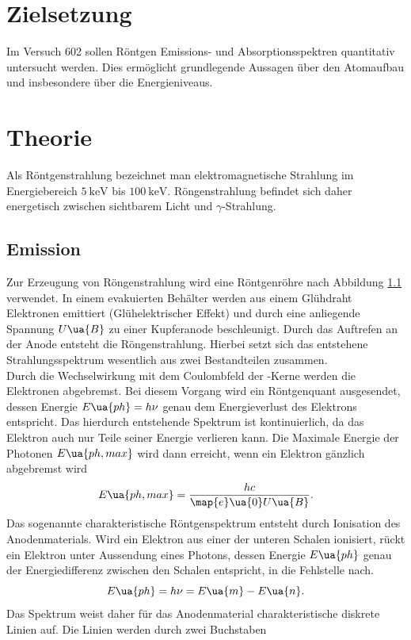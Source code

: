 \setcounter{page}{1}
\section*{Zielsetzung}
Im Versuch 602 sollen Röntgen Emissions- und Absorptionsspektren quantitativ untersucht werden.
Dies ermöglicht grundlegende Aussagen über den Atomaufbau und insbesondere über die Energieniveaus.
\section{Theorie}
Als Röntgenstrahlung bezeichnet man elektromagnetische Strahlung im Energiebereich $\SI{5}{\kilo\eV}$
bis $\SI{100}{\kilo\eV}$. Röngenstrahlung befindet sich daher energetisch zwischen sichtbarem Licht und
$\gamma$-Strahlung.
\subsection{Emission}
Zur Erzeugung von Röngenstrahlung wird eine Röntgenröhre nach Abbildung \ref{} verwendet. In einem
evakuierten Behälter werden aus einem Glühdraht Elektronen emittiert (Glühelektrischer Effekt) und durch eine
anliegende Spannung $U\ua{B}$ zu einer Kupferanode beschleunigt. Durch das Auftrefen an der Anode
entsteht die Röngenstrahlung. Hierbei setzt sich das entstehene Strahlungsspektrum wesentlich aus zwei
Bestandteilen zusammen.\\
Durch die Wechselwirkung mit dem Coulombfeld der -Kerne werden die Elektronen abgebremst. Bei diesem
Vorgang wird ein Röntgenquant ausgesendet, dessen Energie $E\ua{ph} = h\nu$ genau dem Energieverlust des Elektrons
entspricht. Das hierdurch entstehende Spektrum ist kontinuierlich, da das Elektron auch nur Teile seiner
Energie verlieren kann. Die Maximale Energie der Photonen $E\ua{ph, max}$ wird dann erreicht,
wenn ein Elektron gänzlich abgebremst wird
\begin{equation}
  E\ua{ph, max} = \frac{h c}{\map{e}\ua{0}U\ua{B}}.
\end{equation}
Das sogenannte charakteristische Röntgenspektrum entsteht durch Ionisation des Anodenmaterials.
Wird ein Elektron aus einer der unteren Schalen ionisiert, rückt ein Elektron unter Aussendung eines
Photons, dessen Energie $E\ua{ph}$ genau der Energiedifferenz zwischen den Schalen entspricht, in die Fehlstelle nach.
\begin{equation}
  E\ua{ph} = h\nu = E\ua{m} - E\ua{n}.
\end{equation}
Das Spektrum weist daher für das Anodenmaterial charakteristische diskrete Linien auf. Die Linien werden durch zwei Buchstaben

